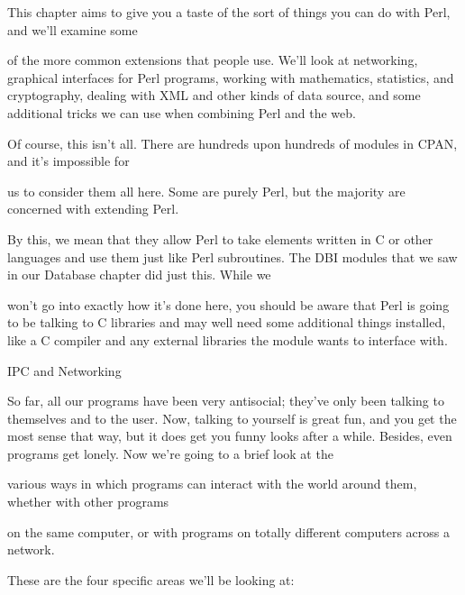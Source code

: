 \documentclass[a4paper,11pt]{book}
\begin{document}
\noindent 

\noindent This chapter aims to give you a taste of the sort of things you can do with Perl, and we'll examine some

\noindent of the more common extensions that people use. We'll look at networking, graphical interfaces for Perl programs, working with mathematics, statistics, and cryptography, dealing with XML and other kinds of data source, and some additional tricks we can use when combining Perl and the web.

\noindent 

\noindent Of course, this isn't all. There are hundreds upon hundreds of modules in CPAN, and it's impossible for

\noindent us to consider them all here. Some are purely Perl, but the majority are concerned with extending Perl.

\noindent By this, we mean that they allow Perl to take elements written in C or other languages and use them just like Perl subroutines. The DBI modules that we saw in our Database chapter did just this. While we

\noindent won't go into exactly how it's done here, you should be aware that Perl is going to be talking to C libraries and may well need some additional things installed, like a C compiler and any external libraries the module wants to interface with.

\noindent 

\noindent 

\noindent IPC and Networking

\noindent So far, all our programs have been very antisocial; they've only been talking to themselves and to the user. Now, talking to yourself is great fun, and you get the most sense that way, but it does get you funny looks after a while. Besides, even programs get lonely. Now we're going to a brief look at the

\noindent various ways in which programs can interact with the world around them, whether with other programs

\noindent on the same computer, or with programs on totally different computers across a network.

\noindent  

\noindent  

\noindent  

\noindent  

\noindent 

\noindent 

\noindent These are the four specific areas we'll be looking at:
\end{document}
